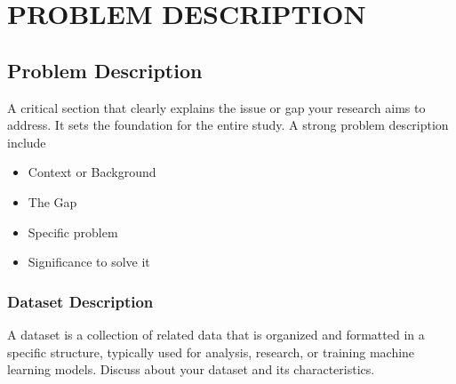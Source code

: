 \chapter{\uppercase{Problem Description}}

\section{Problem Description}
A critical section that clearly explains the issue or gap your research aims to address. It sets the foundation for the entire study. A strong problem description include

\begin{itemize}
	\item Context or Background
	\item The Gap
	\item Specific problem 
	\item Significance to solve it
\end{itemize}
\subsection{Dataset Description}
A dataset is a collection of related data that is organized and formatted in a specific structure, typically used for analysis, research, or training machine learning models. Discuss about your dataset and its characteristics.
